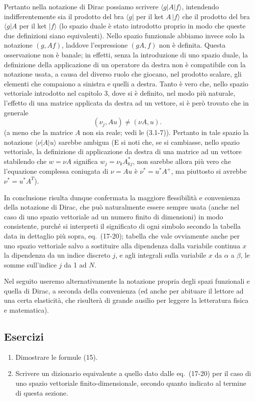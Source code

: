 \documentclass[11pt, a4paper]{book}
\numberwithin{equation}{section}
\newenvironment{esercizi}{\subsection*{Esercizi}\begin{enumerate}}{\end{enumerate}}
\begin{document}
Pertanto nella notazione di Dirac possiamo scrivere $\langle g|A|f\rangle$,
intendendo indifferentemente sia il prodotto del bra $\langle g|$ per il
ket $A\,|f\rangle$ che il prodotto del bra $\langle g|A$ per il ket
$|f\rangle$ (lo spazio duale è stato introdotto proprio in modo che queste
due definizioni siano equivalenti). Nello spazio funzionale abbiamo invece
solo la notazione $(g,Af)$, laddove l'espressione $(gA, f)$ non è definita.
Questa osservazione non è banale; in effetti, senza la introduzione di uno
spazio duale, la definizione della applicazione di un operatore da destra
non è compatibile con la notazione usata, a causa del diverso ruolo che
giocano, nel prodotto scalare, gli elementi che compaiono a sinistra e
quelli a destra. Tanto è vero che, nello spazio vettoriale introdotto nel
capitolo 3, dove si è definito, nel modo più naturale, l'effetto di una
matrice applicata da destra ad un vettore, si è però trovato che in
generale
\begin{equation}
(\nu_j, Au) \neq (\nu A, u).
\end{equation}
(a meno che la matrice $A$ non sia reale; vedi le (3.1-7)). Pertanto in
tale spazio la notazione $\langle\nu|A|u\rangle$ sarebbe ambigua (E si
noti che, se si cambiasse, nello spazio vettoriale, la definizione di
applicazione da destra di una matrice ad un vettore stabilendo che $w =
\nu A$ significa $w_j = \nu_k A_{kj}^*$, non sarebbe allora più vero che
l'equazione complessa coniugata di $\nu = Au$ è $\nu^* = u^* A^+$, ma
piuttosto si avrebbe $\nu^* = u^*A^T$).

In conclusione risulta dunque confermata la maggiore flessibilità e
convenienza della notazione di Dirac, che può naturalmente essere sempre
usata (anche nel caso di uno spazio vettoriale ad un numero finito di
dimensioni) in modo consistente, purché si interpreti il significato di
ogni simbolo secondo la tabella data in dettaglio più sopra, eq.\
(17-20); tabella che vale ovviamente anche per uno spazio vettoriale
salvo a sostituire alla dipendenza dalla variabile continua $x$ la
dipendenza da un indice discreto $j$, e agli integrali sulla variabile
$x$ da $\alpha$ a $\beta$, le somme sull'indice $j$ da 1 ad $N$.

Nel seguito useremo alternativamente la notazione propria degli
spazi funzionali e quella di Dirac, a seconda della convenienza (ed anche
per abituare il lettore ad una certa elasticità, che risulterà di grande
ausilio per leggere la letteratura fisica e matematica).

\begin{esercizi}

\item Dimostrare le formule (15).

\item Scrivere un dizionario equivalente a quello dato dalle eq.\
(17-20) per il caso di uno spazio vettoriale finito-dimensionale, secondo
quanto indicato al termine di questa sezione.

\end{esercizi}
\end{document}
